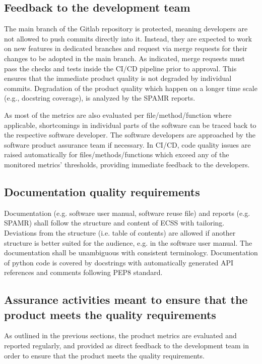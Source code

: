 \subsection{Feedback to the development team}
The main branch of the Gitlab repository is protected, meaning developers are not allowed to push commits directly into it. Instead, they are expected to work on new features in dedicated branches and request via merge requests for their changes to be adopted in the main branch. As indicated, merge requests must pass the checks and tests inside the CI/CD pipeline prior to approval. This ensures that the immediate product quality is not degraded by individual commits. Degradation of the product quality which happen on a longer time scale (e.g., docstring coverage), is analyzed by the SPAMR reports.

As most of the metrics are also evaluated per file/method/function where applicable, shortcomings in individual parts of the software can be traced back to the respective software developer. The software developers are approached by the software product assurance team if necessary. In CI/CD, code quality issues are raised automatically for files/methods/functions which exceed any of the monitored metrics' thresholds, providing immediate feedback to the developers.

\subsection{Documentation quality requirements}

Documentation (e.g. software user manual, software reuse file) and reports (e.g. SPAMR) shall follow the structure and content of ECSS with tailoring. Deviations from the structure (i.e. table of contents) are allowed if another structure is better suited for the audience, e.g. in the software user manual. The documentation shall be unambiguous with consistent terminology. Documentation of python code is covered by docstrings with automatically generated API references and comments following PEP8 standard. 

\subsection{Assurance activities meant to ensure that the product meets the quality requirements}

As outlined in the previous sections, the product metrics are evaluated and reported regularly, and provided as direct feedback to the development team in order to ensure that the product meets the quality requirements.
